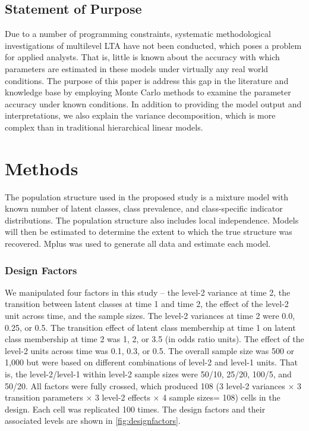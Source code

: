 \documentclass[man]{apa6}
\begin{document}
\subsection*{Statement of Purpose}
Due to a number of programming constraints, systematic methodological investigations of multilevel LTA have not been conducted, which poses a problem for applied analysts. That is, little is known about the accuracy with which parameters are estimated in these models under virtually any real world conditions. The purpose of this paper is address this gap in the literature and knowledge base by employing Monte Carlo methods to examine the parameter accuracy under known conditions. In addition to providing the model output and interpretations, we also explain the variance decomposition, which is more complex than in traditional hierarchical linear models.

\section*{Methods}
The population structure used in the proposed study is a mixture model with known number of latent classes, class prevalence, and class-specific indicator distributions. The population structure also includes local independence. Models will then be estimated to determine the extent to which the true structure was recovered.  Mplus was used to generate all data and estimate each model. 

\subsubsection*{Design Factors}
We manipulated four factors in this study -- the level-2 variance at time 2, the transition between latent classes at time 1 and time 2, the effect of the level-2 unit across time, and the sample sizes. The level-2 variances at time 2 were 0.0, 0.25, or 0.5. The transition effect of latent class membership at time 1 on latent class membership at time 2 was 1, 2, or 3.5 (in odds ratio units). The effect of the level-2 units across time was 0.1, 0.3, or 0.5. The overall sample size was 500 or 1,000 but were based on different combinations of level-2 and level-1 units. That is, the level-2/level-1 within level-2 sample sizes were 50/10, 25/20, 100/5, and 50/20. All factors were fully crossed, which produced 108 (3 level-2 variances $\times$ 3 transition parameters $\times$ 3 level-2 effects $\times$ 4 sample sizes= 108) cells in the design. Each cell was replicated 100 times. The design factors and their associated levels are shown in \autoref{fig:designfactors}.
\end{document}
